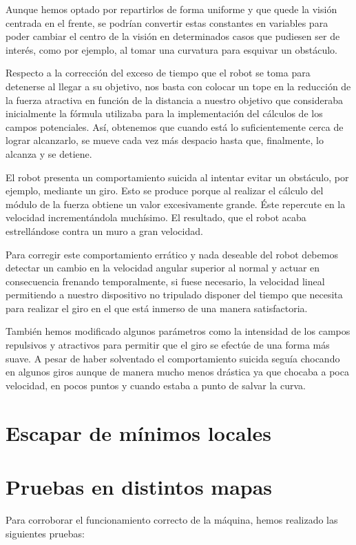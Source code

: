 \documentclass[a4paper, 11pt]{article}
\begin{document}
	Aunque hemos optado por repartirlos de forma uniforme y que quede la visión centrada en el frente,
	se podrían convertir estas constantes en variables para poder cambiar el centro de la visión en
	determinados casos que pudiesen ser de interés, como por ejemplo, al tomar una curvatura para esquivar
	un obstáculo.

	Respecto a la corrección del exceso de tiempo que el robot se toma para detenerse al llegar a su
	objetivo, nos basta con colocar un tope en la reducción de la fuerza atractiva en función de la
	distancia a nuestro objetivo que consideraba inicialmente la fórmula utilizaba para la implementación
	del cálculos de los campos potenciales. Así, obtenemos que cuando está lo suficientemente cerca de
	lograr alcanzarlo, se mueve cada vez más despacio hasta que, finalmente, lo alcanza y se detiene.
	
	El robot presenta un comportamiento suicida al intentar evitar un obstáculo, por ejemplo, mediante
	un giro. Esto se produce porque al realizar el cálculo del módulo de la fuerza obtiene un valor
	excesivamente grande. Éste repercute en la velocidad incrementándola muchísimo. El resultado, que
	el robot acaba estrellándose contra un muro a gran velocidad.
	
	Para corregir este comportamiento errático y nada deseable del robot debemos detectar un cambio en
	la velocidad angular superior al normal y actuar en consecuencia frenando temporalmente, si fuese
	necesario, la velocidad lineal permitiendo a nuestro dispositivo no tripulado disponer del tiempo
	que necesita para realizar el giro en el que está inmerso de una manera satisfactoria.
	
	También hemos modificado algunos parámetros como la intensidad de los campos repulsivos y atractivos
	para permitir que el giro se efectúe de una forma más suave. A pesar de haber solventado el
	comportamiento suicida seguía chocando en algunos giros aunque de manera mucho menos drástica ya
	que chocaba a poca velocidad, en pocos puntos y cuando estaba a punto de salvar la curva.

\section{Escapar de mínimos locales}


\section{Pruebas en distintos mapas}
	Para corroborar el funcionamiento correcto de la máquina, hemos realizado las siguientes pruebas:
\end{document}

